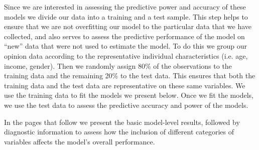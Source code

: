 

Since we are interested in assessing the predictive power and accuracy of these models we divide our data into a training and a test sample. This step helps to ensure that we are not overfitting our model to the particular data that we have collected, and also serves to assess the predictive performance of the model on ``new'' data that were not used to estimate the model. To do this we group our opinion data according to the representative individual characteristics (i.e. age, income, gender). Then we randomly assign 80\% of the observations to the training data and the remaining 20\% to the test data. This ensures that both the training data and the test data are representative on these same variables. We use the training data to fit the models we present below. Once we fit the models, we use the test data to assess the predictive accuracy and power of the models.

In the pages that follow we present the basic model-level results, followed by diagnostic information to assess how the inclusion of different categories of variables affects the model's overall performance. 